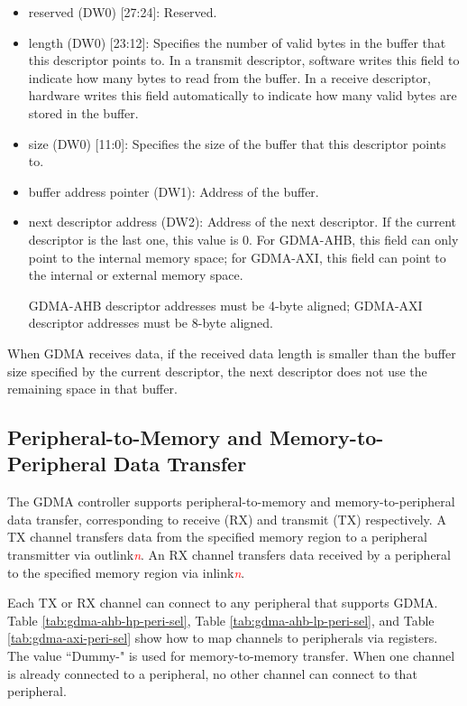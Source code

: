 \documentclass[main\_\_EN.tex]{subfiles}
\begin{document}
\begin{itemize}
    This bit applies only when UHCI or PARLIO receives data via GDMA. Hardware sets this bit to 1 when it detects an error in the data segment corresponding to a descriptor.
    \item reserved (DW0) [27:24]: Reserved.
    \item length (DW0) [23:12]: Specifies the number of valid bytes in the buffer that this descriptor points to. In a transmit descriptor, software writes this field to indicate how many bytes to read from the buffer. In a receive descriptor, hardware writes this field automatically to indicate how many valid bytes are stored in the buffer.
    \item size (DW0) [11:0]: Specifies the size of the buffer that this descriptor points to.
    \item buffer address pointer (DW1): Address of the buffer.
    \item next descriptor address (DW2): Address of the next descriptor. If the current descriptor is the last one, this value is 0. For GDMA-AHB, this field can only point to the internal memory space; for GDMA-AXI, this field can point to the internal or external memory space.
        \begin{tiplisting}
            GDMA-AHB descriptor addresses must be 4-byte aligned; GDMA-AXI descriptor addresses must be 8-byte aligned.
        \end{tiplisting}
\end{itemize}

When GDMA receives data, if the received data length is smaller than the buffer size specified by the current descriptor, the next descriptor does not use the remaining space in that buffer.

\subsection{Peripheral-to-Memory and Memory-to-Peripheral Data Transfer}

The GDMA controller supports peripheral-to-memory and memory-to-peripheral data transfer, corresponding to receive (RX) and transmit (TX) respectively. A TX channel transfers data from the specified memory region to a peripheral transmitter via outlink\textcolor{red}{\it{n}}. An RX channel transfers data received by a peripheral to the specified memory region via inlink\textcolor{red}{\it{n}}.

Each TX or RX channel can connect to any peripheral that supports GDMA. Table \ref{tab:gdma-ahb-hp-peri-sel}, Table \ref{tab:gdma-ahb-lp-peri-sel}, and Table \ref{tab:gdma-axi-peri-sel} show how to map channels to peripherals via registers. The value ``Dummy-" is used for memory-to-memory transfer. When one channel is already connected to a peripheral, no other channel can connect to that peripheral.
\end{document}
